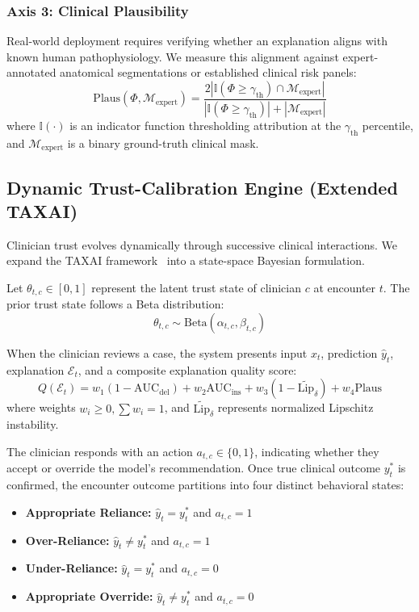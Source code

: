 \documentclass[10pt,journal,compsoc]{IEEEtran}
\begin{document}
\subsubsection{Axis 3: Clinical Plausibility}
Real-world deployment requires verifying whether an explanation aligns with known human pathophysiology. We measure this alignment against expert-annotated anatomical segmentations or established clinical risk panels:
\begin{equation}
\text{Plaus}(\Phi, \mathcal{M}_{\text{expert}}) = \frac{2 \left| \mathbb{I}(\Phi \ge \gamma_{\text{th}}) \cap \mathcal{M}_{\text{expert}} \right|}{\left| \mathbb{I}(\Phi \ge \gamma_{\text{th}}) \right| + \left| \mathcal{M}_{\text{expert}} \right|}
\end{equation}
where $\mathbb{I}(\cdot)$ is an indicator function thresholding attribution at the $\gamma_{\text{th}}$ percentile, and $\mathcal{M}_{\text{expert}}$ is a binary ground-truth clinical mask.

\subsection{Dynamic Trust-Calibration Engine (Extended TAXAI)}
Clinician trust evolves dynamically through successive clinical interactions. We expand the TAXAI framework~\cite{balayan2026taxai} into a state-space Bayesian formulation. 

Let $\theta_{t, c} \in [0, 1]$ represent the latent trust state of clinician $c$ at encounter $t$. The prior trust state follows a Beta distribution:
\begin{equation}
\theta_{t, c} \sim \text{Beta}(\alpha_{t, c}, \beta_{t, c})
\end{equation}

When the clinician reviews a case, the system presents input $x_t$, prediction $\hat{y}_t$, explanation $\mathcal{E}_t$, and a composite explanation quality score:
\begin{equation}
Q(\mathcal{E}_t) = w_1 (1 - \text{AUC}_{\text{del}}) + w_2 \text{AUC}_{\text{ins}} + w_3 (1 - \tilde{\text{Lip}}_\delta) + w_4 \text{Plaus}
\end{equation}
where weights $w_i \ge 0, \sum w_i = 1$, and $\tilde{\text{Lip}}_\delta$ represents normalized Lipschitz instability. 

The clinician responds with an action $a_{t, c} \in \{0, 1\}$, indicating whether they accept or override the model's recommendation. Once true clinical outcome $y^*_t$ is confirmed, the encounter outcome partitions into four distinct behavioral states:
\begin{itemize}
    \item \textbf{Appropriate Reliance:} $\hat{y}_t = y^*_t$ and $a_{t, c} = 1$
    \item \textbf{Over-Reliance:} $\hat{y}_t \ne y^*_t$ and $a_{t, c} = 1$
    \item \textbf{Under-Reliance:} $\hat{y}_t = y^*_t$ and $a_{t, c} = 0$
    \item \textbf{Appropriate Override:} $\hat{y}_t \ne y^*_t$ and $a_{t, c} = 0$
\end{itemize}
\end{document}
